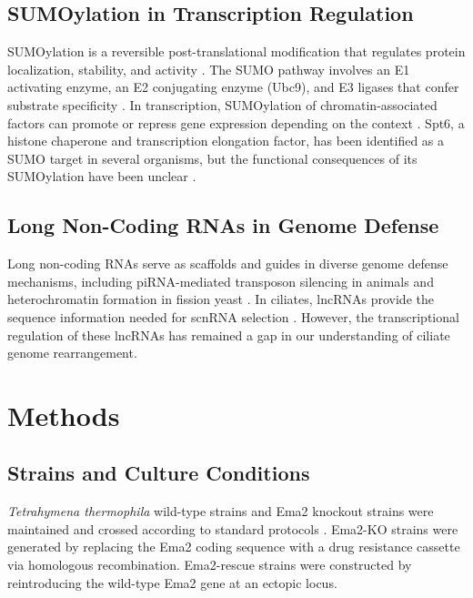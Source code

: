 \documentclass[11pt]{article}
\begin{document}
\subsection{SUMOylation in Transcription Regulation}

SUMOylation is a reversible post-translational modification that regulates protein localization, stability, and activity \citep{gareau2010}. The SUMO pathway involves an E1 activating enzyme, an E2 conjugating enzyme (Ubc9), and E3 ligases that confer substrate specificity \citep{johnson2004}. In transcription, SUMOylation of chromatin-associated factors can promote or repress gene expression depending on the context \citep{rosonina2017}. Spt6, a histone chaperone and transcription elongation factor, has been identified as a SUMO target in several organisms, but the functional consequences of its SUMOylation have been unclear \citep{bortvin1996,close2011}.

\subsection{Long Non-Coding RNAs in Genome Defense}

Long non-coding RNAs serve as scaffolds and guides in diverse genome defense mechanisms, including piRNA-mediated transposon silencing in animals \citep{czech2018} and heterochromatin formation in fission yeast \citep{verdel2004}. In ciliates, lncRNAs provide the sequence information needed for scnRNA selection \citep{noto2015,mochizuki2012}. However, the transcriptional regulation of these lncRNAs has remained a gap in our understanding of ciliate genome rearrangement.

\section{Methods}

\subsection{Strains and Culture Conditions}

\textit{Tetrahymena thermophila} wild-type strains and Ema2 knockout strains were maintained and crossed according to standard protocols \citep{orias2011}. Ema2-KO strains were generated by replacing the Ema2 coding sequence with a drug resistance cassette via homologous recombination. Ema2-rescue strains were constructed by reintroducing the wild-type Ema2 gene at an ectopic locus.
\end{document}
